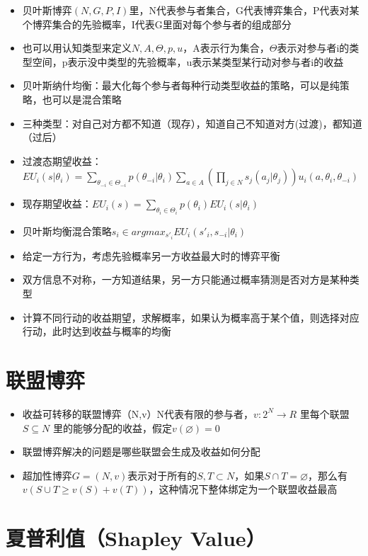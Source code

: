 \documentclass[
]{book}
\providecommand{\tightlist}{%
  \setlength{\itemsep}{0pt}\setlength{\parskip}{0pt}}
\begin{document}
\begin{itemize}
\tightlist
\item
  贝叶斯博弈\((N,G,P,I)\)里，N代表参与者集合，G代表博弈集合，P代表对某个博弈集合的先验概率，I代表G里面对每个参与者的组成部分
\item
  也可以用认知类型来定义\(N,A,\Theta,p,u\)，A表示行为集合，\(\Theta\)表示对参与者i的类型空间，p表示没中类型的先验概率，u表示某类型某行动对参与者i的收益
\item
  贝叶斯纳什均衡：最大化每个参与者每种行动类型收益的策略，可以是纯策略，也可以是混合策略
\item
  三种类型：对自己对方都不知道（现存），知道自己不知道对方(过渡)，都知道（过后）
\item
  过渡态期望收益：\(EU_i(s|\theta_i) = \sum_{\theta_{-i}\in\Theta_{-i}}p(\theta_{-i}|\theta_i)\sum_{a\in A}(\prod_{j\in N}s_j(a_j|\theta_j))u_i(a,\theta_i,\theta_{-i})\)
\item
  现存期望收益：\(EU_i(s) = \sum_{\theta_i\in \Theta_i}p(\theta_i)EU_i(s|\theta_i)\)
\item
  贝叶斯均衡混合策略\(s_i\in arg max_{s'_i}EU_i(s'_i,s_{-i}|\theta_i)\)
\item
  给定一方行为，考虑先验概率另一方收益最大时的博弈平衡
\item
  双方信息不对称，一方知道结果，另一方只能通过概率猜测是否对方是某种类型
\item
  计算不同行动的收益期望，求解概率，如果认为概率高于某个值，则选择对应行动，此时达到收益与概率的均衡
\end{itemize}

\hypertarget{ux8054ux76dfux535aux5f08}{%
\section{联盟博弈}\label{ux8054ux76dfux535aux5f08}}

\begin{itemize}
\tightlist
\item
  收益可转移的联盟博弈（N,v）N代表有限的参与者，\(v:2^N \rightarrow R\) 里每个联盟 \(S\subseteq N\) 里的能够分配的收益，假定\(v(\varnothing)=0\)
\item
  联盟博弈解决的问题是哪些联盟会生成及收益如何分配
\item
  超加性博弈\(G=(N,v)\)表示对于所有的\(S,T\subset N\)，如果\(S\cap T = \varnothing\)，那么有\(v(S\cup T\geq v(S)+v(T))\)，这种情况下整体绑定为一个联盟收益最高
\end{itemize}

\hypertarget{ux590fux666eux5229ux503cshapley-value}{%
\section{夏普利值（Shapley Value）}\label{ux590fux666eux5229ux503cshapley-value}}
\end{document}
